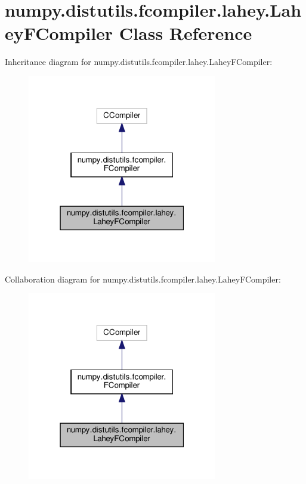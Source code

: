\hypertarget{classnumpy_1_1distutils_1_1fcompiler_1_1lahey_1_1LaheyFCompiler}{}\section{numpy.\+distutils.\+fcompiler.\+lahey.\+Lahey\+F\+Compiler Class Reference}
\label{classnumpy_1_1distutils_1_1fcompiler_1_1lahey_1_1LaheyFCompiler}


Inheritance diagram for numpy.\+distutils.\+fcompiler.\+lahey.\+Lahey\+F\+Compiler\+:
\nopagebreak
\begin{figure}[H]
\begin{center}
\leavevmode
\includegraphics[width=235pt]{classnumpy_1_1distutils_1_1fcompiler_1_1lahey_1_1LaheyFCompiler__inherit__graph}
\end{center}
\end{figure}


Collaboration diagram for numpy.\+distutils.\+fcompiler.\+lahey.\+Lahey\+F\+Compiler\+:
\nopagebreak
\begin{figure}[H]
\begin{center}
\leavevmode
\includegraphics[width=235pt]{classnumpy_1_1distutils_1_1fcompiler_1_1lahey_1_1LaheyFCompiler__coll__graph}
\end{center}
\end{figure}
